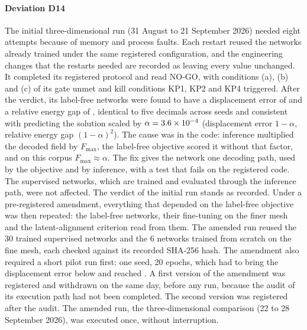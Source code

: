 

\paragraph{Deviation D14}
The initial three-dimensional run (31 August to 21 September 2026) needed eight attempts
because of memory and process faults. Each restart reused the networks already trained under
the same registered configuration, and the engineering changes that the restarts needed are
recorded as leaving every value unchanged. It completed its registered protocol and read
NO-GO, with conditions (a), (b) and (c) of its gate unmet and kill conditions KP1, KP2 and
KP4 triggered. After the verdict, its label-free networks were found to have a displacement
error of \numDfourteenDisp{} and a relative energy gap of \numDfourteenGap{}, identical to
five decimals across seeds and consistent with predicting the solution scaled by
$\alpha=3.6 \times 10^{-4}{}$ (displacement error $1-\alpha$, relative energy gap
$(1-\alpha)^2$). The cause was in the code: inference multiplied the decoded field by
$F_{\max}$, the label-free objective scored it without that factor, and on this corpus
$F_{\max}\approx\alpha$. The fix gives the network one decoding path, used by the objective
and by inference, with a test that fails on the registered code. The supervised networks,
which are trained and evaluated through the inference path, were not affected. The verdict
of the initial run stands as recorded. Under a pre-registered amendment, everything that
depended on the label-free objective was then repeated: the label-free networks, their
fine-tuning on the finer mesh and the latent-alignment criterion read from them. The amended
run reused the 30 trained supervised networks and the 6 networks trained from scratch on the fine mesh, each checked against its recorded SHA-256 hash. The amendment also required a short pilot run first: one seed, 20
epochs, which had to bring the displacement error below \numPilotLimit{} and reached
\numPilotDisp{}. A first version of the amendment was registered and withdrawn on the same
day, before any run, because the audit of its execution path had not been completed. The second version was registered after the audit. The amended run, the three-dimensional
comparison (22 to 28 September 2026), was executed once, without interruption.

